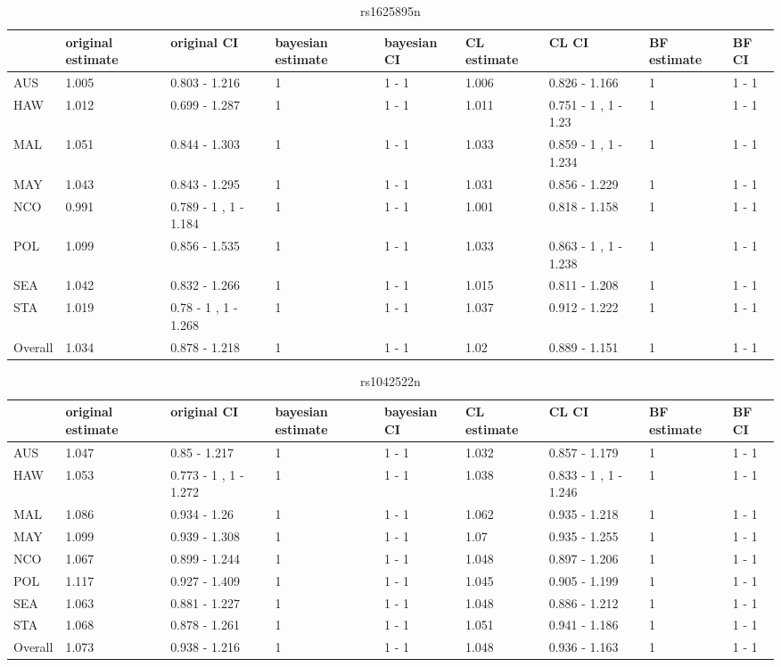 \documentclass[AMA,STIX1COL]{WileyNJD-v2}\usepackage[]{graphicx}\usepackage[]{color}
\begin{document}
\begin{table}

\caption{\label{tab:unnamed-chunk-39}rs1625895n}
\centering
\begin{tabular}[t]{l|l|l|l|l|l|l|l|l}
\hline
  & original estimate & original CI & bayesian estimate & bayesian CI & CL estimate & CL CI & BF estimate & BF CI\\
\hline
AUS & 1.005 & 0.803 - 1.216 & 1 & 1 - 1 & 1.006 & 0.826 - 1.166 & 1 & 1 - 1\\
\hline
HAW & 1.012 & 0.699 - 1.287 & 1 & 1 - 1 & 1.011 & 0.751 - 1 ,  1 - 1.23 & 1 & 1 - 1\\
\hline
MAL & 1.051 & 0.844 - 1.303 & 1 & 1 - 1 & 1.033 & 0.859 - 1 ,  1 - 1.234 & 1 & 1 - 1\\
\hline
MAY & 1.043 & 0.843 - 1.295 & 1 & 1 - 1 & 1.031 & 0.856 - 1.229 & 1 & 1 - 1\\
\hline
NCO & 0.991 & 0.789 - 1 ,  1 - 1.184 & 1 & 1 - 1 & 1.001 & 0.818 - 1.158 & 1 & 1 - 1\\
\hline
POL & 1.099 & 0.856 - 1.535 & 1 & 1 - 1 & 1.033 & 0.863 - 1 ,  1 - 1.238 & 1 & 1 - 1\\
\hline
SEA & 1.042 & 0.832 - 1.266 & 1 & 1 - 1 & 1.015 & 0.811 - 1.208 & 1 & 1 - 1\\
\hline
STA & 1.019 & 0.78 - 1 ,  1 - 1.268 & 1 & 1 - 1 & 1.037 & 0.912 - 1.222 & 1 & 1 - 1\\
\hline
Overall & 1.034 & 0.878 - 1.218 & 1 & 1 - 1 & 1.02 & 0.889 - 1.151 & 1 & 1 - 1\\
\hline
\end{tabular}
\end{table}
\begin{table}

\caption{\label{tab:unnamed-chunk-39}rs1042522n}
\centering
\begin{tabular}[t]{l|l|l|l|l|l|l|l|l}
\hline
  & original estimate & original CI & bayesian estimate & bayesian CI & CL estimate & CL CI & BF estimate & BF CI\\
\hline
AUS & 1.047 & 0.85 - 1.217 & 1 & 1 - 1 & 1.032 & 0.857 - 1.179 & 1 & 1 - 1\\
\hline
HAW & 1.053 & 0.773 - 1 ,  1 - 1.272 & 1 & 1 - 1 & 1.038 & 0.833 - 1 ,  1 - 1.246 & 1 & 1 - 1\\
\hline
MAL & 1.086 & 0.934 - 1.26 & 1 & 1 - 1 & 1.062 & 0.935 - 1.218 & 1 & 1 - 1\\
\hline
MAY & 1.099 & 0.939 - 1.308 & 1 & 1 - 1 & 1.07 & 0.935 - 1.255 & 1 & 1 - 1\\
\hline
NCO & 1.067 & 0.899 - 1.244 & 1 & 1 - 1 & 1.048 & 0.897 - 1.206 & 1 & 1 - 1\\
\hline
POL & 1.117 & 0.927 - 1.409 & 1 & 1 - 1 & 1.045 & 0.905 - 1.199 & 1 & 1 - 1\\
\hline
SEA & 1.063 & 0.881 - 1.227 & 1 & 1 - 1 & 1.048 & 0.886 - 1.212 & 1 & 1 - 1\\
\hline
STA & 1.068 & 0.878 - 1.261 & 1 & 1 - 1 & 1.051 & 0.941 - 1.186 & 1 & 1 - 1\\
\hline
Overall & 1.073 & 0.938 - 1.216 & 1 & 1 - 1 & 1.048 & 0.936 - 1.163 & 1 & 1 - 1\\
\hline
\end{tabular}
\end{table}
\end{document}
